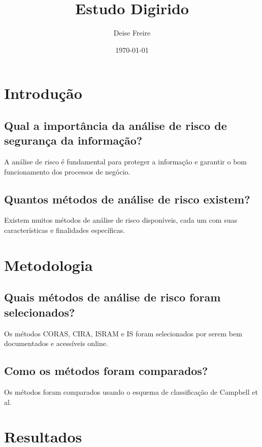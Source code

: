 \documentclass[a4paper,12pt]{report}
\title{Estudo Digirido} %
\author{Deise Freire} %
\date{\today} %
\begin{document}
\maketitle %

\tableofcontents %



\section{Introdução}

\subsection{Qual a importância da análise de risco de segurança da informação?}

A análise de risco é fundamental para proteger a informação e garantir o bom funcionamento dos processos de negócio.

\subsection{Quantos métodos de análise de risco existem?}

Existem muitos métodos de análise de risco disponíveis, cada um com suas características e finalidades específicas.

\section{Metodologia}

\subsection{Quais métodos de análise de risco foram selecionados?}

Os métodos CORAS, CIRA, ISRAM e IS foram selecionados por serem bem documentados e acessíveis online.

\subsection{Como os métodos foram comparados?}

Os métodos foram comparados usando o esquema de classificação de Campbell et al.

\section{Resultados}
\end{document}
